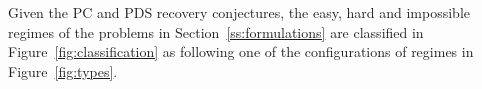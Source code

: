 \begin{theorem} \label{lem:2a}
Given the PC and PDS recovery conjectures, the easy, hard and impossible regimes of the problems in Section~\ref{ss:formulations} are classified in Figure~\ref{fig:classification} as following one of the configurations of regimes in Figure~\ref{fig:types}.

\end{theorem}
